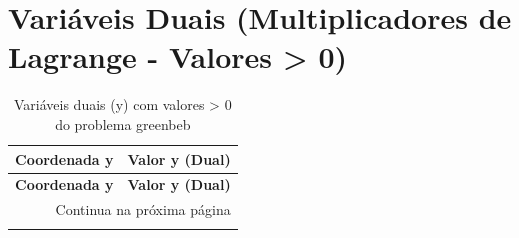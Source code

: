 \documentclass[12pt]{article}
\begin{document}
\section{Variáveis Duais (Multiplicadores de Lagrange - Valores > 0)}

\begin{longtable}{@{}cc@{}}
\caption{Variáveis duais (y) com valores > 0 do problema greenbeb} \\
\toprule
\textbf{Coordenada y} & \textbf{Valor y (Dual)} \\
\midrule
\endfirsthead

\toprule
\textbf{Coordenada y} & \textbf{Valor y (Dual)} \\
\midrule
\endhead

\midrule \multicolumn{2}{r}{{Continua na próxima página}} \\ \midrule
\endfoot


\end{longtable}
\end{document}
